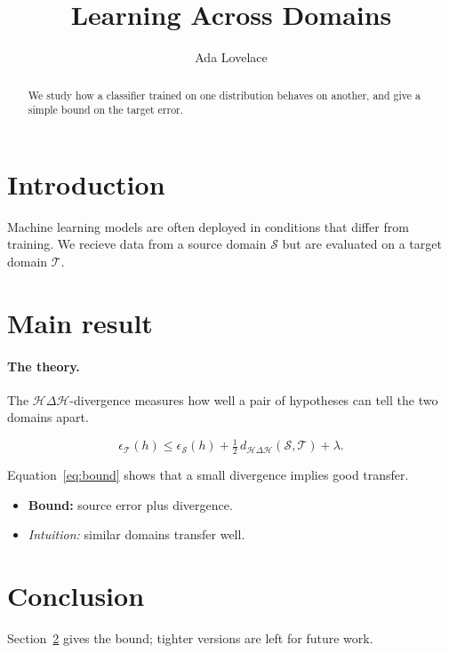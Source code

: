\documentclass[11pt]{article}
\title{Learning Across Domains}
\author{Ada Lovelace}
\date{}
\begin{document}
\maketitle

\begin{abstract}
We study how a classifier trained on one distribution behaves on another, and give a simple bound on the target error.
\end{abstract}

\section{Introduction}
Machine learning models are often deployed in conditions that differ from training. We recieve data from a source domain $\mathcal{S}$ but are evaluated on a target domain $\mathcal{T}$.

\section{Main result}\label{sec:main}
\paragraph{The theory.} The $\mathcal H\Delta\mathcal H$-divergence measures how well a pair of hypotheses can tell the two domains apart.

\begin{equation}\label{eq:bound}
  \epsilon_{\mathcal T}(h) \le \epsilon_{\mathcal S}(h) + \tfrac12\, d_{\mathcal H\Delta\mathcal H}(\mathcal S,\mathcal T) + \lambda .
\end{equation}

Equation~\eqref{eq:bound} shows that a small divergence implies good transfer.

\begin{itemize}
  \item \textbf{Bound:} source error plus divergence.
  \item \emph{Intuition:} similar domains transfer well.
\end{itemize}

\section{Conclusion}
Section~\ref{sec:main} gives the bound; tighter versions are left for future work.
\end{document}
